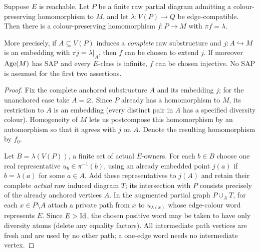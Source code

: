 \begin{theorem}
\label{thm:anchored-relative}
Suppose $E$ is reachable.  Let $P$ be a finite raw partial diagram
admitting a colour-preserving homomorphism to $M$, and let
$\lambda:V(P)\to Q$ be edge-compatible.  Then there is a
colour-preserving homomorphism $f:P\to M$ with
$\pi f=\lambda$.

More precisely, if $A\subseteq V(P)$ induces a \emph{complete}
raw substructure and $j:A\hookrightarrow M$ is an embedding with
$\pi j=\lambda|_A$, then $f$ can be chosen to extend $j$.
If moreover $\operatorname{Age}(M)$ has SAP and every $E$-class is infinite,
$f$ can be chosen injective.  No SAP is assumed for the first two
assertions.
\end{theorem}
\begin{proof}
Fix the complete anchored substructure $A$ and its embedding $j$;
for the unanchored case take $A=\varnothing$.  Since $P$ already has a
homomorphism to $M$, its restriction to $A$ is an embedding (every
distinct pair in $A$ has a specified diversity colour).  Homogeneity
of $M$ lets us postcompose this homomorphism by an automorphism
so that it agrees with $j$ on $A$.  Denote the resulting homomorphism
by $f_0$.

Let $B=\lambda(V(P))$, a finite set of actual $E$-owners.  For each
$b\in B$ choose one real representative $u_b\in\pi^{-1}(b)$, using
an already embedded point $j(a)$ if $b=\lambda(a)$ for some $a\in A$.
Add these representatives to $j(A)$ and retain their complete
\emph{actual} raw induced diagram $T$; its intersection with $P$
consists precisely of the already anchored vertices $A$.  In the
augmented partial graph $P\cup_A T$, for each $x\in P\setminus A$
attach a private path from $x$ to $u_{\lambda(x)}$ whose edge-colour
word represents $E$.  Since $E>\mathrm{Id}$, the chosen positive word may be taken
to have only diversity atoms (delete any equality factors).
All intermediate path vertices are fresh and are used by no other
path; a one-edge word needs no intermediate vertex.


\end{proof}
